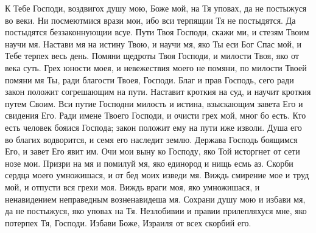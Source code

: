

К Тебе Господи, воздвигох душу мою, Боже мой, на Тя уповах, да не постыжуся во веки. Ни посмеютмися врази мои, ибо вси терпящии Тя не постыдятся. Да постыдятся беззаконнующии всуе. Пути Твоя Господи, скажи ми, и стезям Твоим научи мя. Настави мя на истину Твою, и научи мя, яко Ты еси Бог Спас мой, и Тебе терпех весь день. Помяни щедроты Твоя Господи, и милости Твоя, яко от века суть. Грех юности моея, и невежествия моего не помяни, по милости Твоей помяни мя Ты, ради благости Твоея, Господи. Благ и прав Господь, сего ради закон положит согрешающим на пути. Наставит кроткия на суд, и научит кроткия путем Своим. Вси путие Господни милость и истина, взыскающим завета Его и свидения Его. Ради имене Твоего Господи, и очисти грех мой, мног бо есть. Кто есть человек бояися Господа; закон положит ему на пути иже изволи. Душа его во благих водворится, и семя его наследит землю. Держава Господь боящимся Его, и завет Его явит им. Очи мои выну ко Господу, яко Той исторгнет от сети нозе мои. Призри на мя и помилуй мя, яко единород и нищь есмь аз. Скорби сердца моего умножишася, и от бед моих изведи мя. Виждь смирение мое и труд мой, и отпусти вся грехи моя. Виждь враги моя, яко умножишася, и ненавидением неправедным возненавидеша мя. Сохрани душу мою и избави мя, да не постыжуся, яко уповах на Тя. Незлобивии и правии прилепляхуся мне, яко потерпех Тя, Господи. Избави Боже, Израиля от всех скорбий его.




